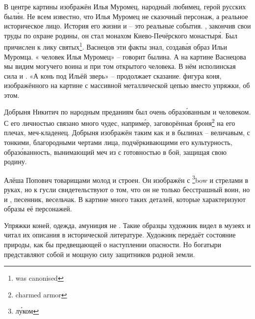 В центре картины изображён Илья Муромец, народный любимец, герой русских был\'{и}н. Не всем известно, что Илья Муромец не сказочный персонаж, а реальное историческое лицо. История его жизни и   -- это реальные события. , закончив свои труды по охране родины, он стал монахом Киево-Печёрского монастыр\'{я}. Был причислен к лику святых\footnote{was canonised}. Васнецов эти факты знал, создав\'{а}я образ Ильи Муромца. « человек Илья Муромец» -- говорит былина. А на картине Васнецова мы видим могучего воина и при том  открытого человека. В нём  исполинская сила и . «А конь под Ильёй  зверь» -- продолжает сказание.  фигура коня, изображённого на картине с массивной металлической цепью вместо упряжки,  об этом.

Добрыня Никитич по народным преданиям был очень образ\'{о}ванным и  человеком. С его личностью связано много чудес, наприм\'{е}р, заговорённая броня\footnote{charmed armor} на его плечах,  меч-кладенец. Добрыня изображён таким как и в былинах -- величавым, с тонкими, благородными чертами лица, подчёркивающими его культурность, образ\'{о}ванность,  вынимающий меч из  с готовностью  в бой, защищая свою родину.

Алёша Попович  товарищами молод и строен. Он изображён с \footnote{л\'{у}ком}{bow} и стрелами в руках, но  к  гусли свидетельствуют о том, что он не только бесстрашный воин, но и , песенник, весельчак. В картине много таких деталей, которые характеризуют образы её персонажей.

Упряжки коней, одежда, амуниция не . Такие образцы художник видел в музеях и читал их описания в исторической литературе. Художник  передаёт состояние природы, как бы предвещающей о наступлении опасности. Но богатыри представляют собой  и мощную силу защитников родной земли.




